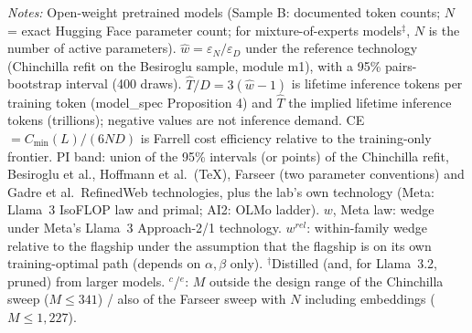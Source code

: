 \begin{table}[htbp]
\begin{threeparttable}
\begin{tablenotes}
\item \textit{Notes:} Open-weight pretrained models (Sample B: documented token counts; $N$ = exact Hugging Face parameter count; for mixture-of-experts models$^{\ddagger}$, $N$ is the number of active parameters). $\hat w=\varepsilon_N/\varepsilon_D$ under the reference technology (Chinchilla refit on the Besiroglu sample, module m1), with a 95\% pairs-bootstrap interval (400 draws). $\hat T/D=3(\hat w-1)$ is lifetime inference tokens per training token (model\_spec Proposition 4) and $\hat T$ the implied lifetime inference tokens (trillions); negative values are not inference demand. CE $=C_{\min}(L)/(6ND)$ is Farrell cost efficiency relative to the training-only frontier. PI band: union of the 95\% intervals (or points) of the Chinchilla refit, Besiroglu et al., Hoffmann et al.\ (TeX), Farseer (two parameter conventions) and Gadre et al.\ RefinedWeb technologies, plus the lab's own technology (Meta: Llama~3 IsoFLOP law and primal; AI2: OLMo ladder). $w$, Meta law: wedge under Meta's Llama~3 Approach-2/1 technology. $w^{rel}$: within-family wedge relative to the flagship under the assumption that the flagship is on its own training-optimal path (depends on $\alpha,\beta$ only). $^{\dagger}$Distilled (and, for Llama~3.2, pruned) from larger models. $^{c}$/$^{e}$: $M$ outside the design range of the Chinchilla sweep ($M\le341$) / also of the Farseer sweep with $N$ including embeddings ($M\le1{,}227$).
\end{tablenotes}
\end{threeparttable}
\end{table}
